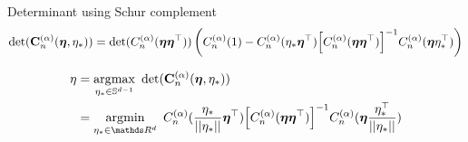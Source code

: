 Determinant using Schur complement
\begin{equation}
    \textrm{det}(\MC_n^{(\alpha)}(\veta, \eta_{*})) = \textrm{det}(C_n^{(\alpha)}(\veta\veta\transpose))\,\left(C_n^{(\alpha)}(1) - C_n^{(\alpha)}(\eta_{*}\veta\transpose) \left[C_n^{(\alpha)}(\veta\veta\transpose)\right]^{-1} C_n^{(\alpha)}(\veta\eta_{*}\transpose) \right)
\end{equation}

\begin{align}
    \eta &= \argmax_{\eta_* \in \dsphere}\ \textrm{det}(\MC_n^{(\alpha)}(\veta, \eta_{*})) \\
    &= \argmin_{\eta_* \in \Reals^d}\ C_n^{(\alpha)}(\frac{\eta_{*}}{\norm{\eta_*}}\veta\transpose) \left[C_n^{(\alpha)}(\veta\veta\transpose)\right]^{-1} C_n^{(\alpha)}(\veta\frac{\eta_{*}\transpose}{\norm{\eta_*}})
\end{align}







